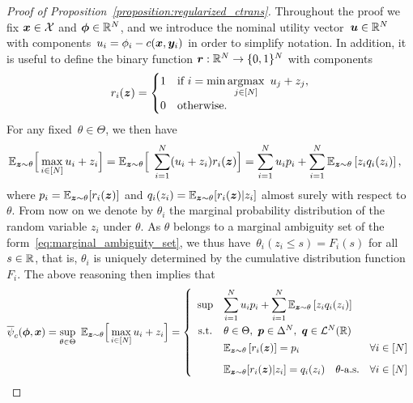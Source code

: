 \documentclass[11pt, a4paper, oneside, reqno]{article}
\begin{document}
	\begin{proof}[Proof of Proposition~\ref{proposition:regularized_ctrans}]
	Throughout the proof we fix $\bm x\in\mathcal{X}$ and $\bm \phi\in \mathbb{R}^N$, and we introduce the nominal utility vector~$\boldsymbol u \in \mathbb{R}^N$ with components~$u_i= \phi_i - c(\boldsymbol x, \boldsymbol y_i)$ in order to simplify notation. In addition, it is useful to define the binary function $\boldsymbol r: \mathbb{R}^N \to \{ 0, 1 \}^N$ with components
	\begin{align*}
	    r_i(\boldsymbol z) = 
	    \begin{cases}
	    1 & \text{if } i = \displaystyle \min \operatorname*{argmax}_{j \in [N]} ~ u_j + z_j, \\
	    0 & \text{otherwise.}
	    \end{cases}
	\end{align*}
	For any fixed~$\theta \in \Theta$, we then have
	\begin{align*}
	    \mathbb{E}_{\boldsymbol z \sim \theta} \Big[ \max\limits_{i \in [N]} u_i + z_{i} \Big] 
	    = \mathbb{E}_{\boldsymbol z \sim \theta} \Big[ \; \sum_{i=1}^N ( u_i + z_i) r_i(\boldsymbol z) \Big]
	    &= \sum_{i=1}^N u_i p_i + \sum_{i=1}^N \mathbb{E}_{\boldsymbol z \sim \theta} \left[ z_i q_i(z_i) \right],
	\end{align*}
	where $p_i = \mathbb{E}_{\boldsymbol z \sim \theta} [ r_i(\boldsymbol z) ]$ and $q_i(z_i) = \mathbb{E}_{\boldsymbol z \sim \theta} [ r_i(\boldsymbol z) | z_i ]$ almost surely with respect to~$\theta$. From now on we denote by $\theta_i$ the marginal probability distribution of the random variable $z_i$ under $\theta$. As $\theta$ belongs to a marginal ambiguity set of the form~\eqref{eq:marginal_ambiguity_set}, we thus have~$\theta_i (z_i \leq s) = F_i(s)$ for all $s \in \mathbb{R}$, that is, $\theta_i$ is uniquely determined by the cumulative distribution function $F_i$. The above reasoning then implies that
	\begin{align}
	\nonumber
	\overline \psi_c(\bs \phi, \bs x)
	= \sup_{\theta \in \Theta} ~ \EE_{\bs z \sim \theta} \Big[ \max_{i \in [N]} u_i + z_i \Big]
	&= \left\{
	\begin{array}{cll}
	\sup & \DS \sum_{i=1}^N u_i p_i + \sum_{i=1}^N \EE_{\bs z \sim \theta} \left[ z_i q_i(z_i) \right] \\[3ex]
	\text{s.t.} & \theta \in \Theta, ~\bs p \in \Delta^N, ~\bs q \in \mathcal L^N(\R) \\ [1ex]
	& \EE_{\bs z \sim \theta} \left[ r_i(\bs z) \right] = p_i & \forall i \in [N] \\[2ex]
	& \EE_{\bs z \sim \theta} [ r_i(\bs z) | z_i ] = q_i(z_i) \quad \theta\text{-a.s.} & \forall i \in [N]
	\end{array} \right.\\

\end{align}
\end{proof}
\end{document}
